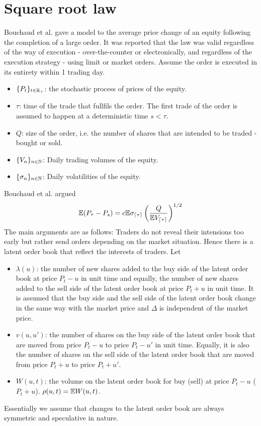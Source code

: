 \section{Square root law}
Bouchaud et al. \cite{Bouchaud2011} gave a model to the average price
change of an equity following the completion of a large order. It was
reported that the law was valid regardless of the way of execution -
over-the-counter or electronically, and regardless of the execution
strategy - using limit or market orders. Assume the order is executed
in its entirety within 1 trading day.
\begin{itemize}
\item $\{P_t\}_{t \in \mathbb R_+}$: the stochastic process of prices of
  the equity.
\item $\tau$: time of the trade that fullfils the order. The first
  trade of the order is assumed to happen at a deterministic time
  $s < \tau$.
\item $Q$: size of the order, i.e. the number of shares that are
  intended to be traded - bought or sold.
\item $\{V_n\}_{n \in \mathbb N}$: Daily trading volumes of the
  equity.
\item $\{\sigma_n\}_{n \in \mathbb N}$: Daily volatilities of the
  equity.
\end{itemize}
Bouchaud et al. argued
\[
  \mathbb{E} (P_\tau - P_s) = c \mathbb{E} \sigma_{\lceil \tau\rceil} \left(
    {Q \over \mathbb{E} V_{\lceil \tau\rceil}}
  \right)^{1/2}
\]
The main arguments are as follows: Traders do not reveal their
intensions too early but rather send orders depending on the market
situation. Hence there is a latent order book that reflect the
interests of traders. Let
\begin{itemize}
\item $\lambda(u)$: the number of new shares added to the buy side of
  the latent order book at price $P_t - u$ in unit time and equally,
  the number of new shares added to the sell side of the latent order
  book at price $P_t + u$ in unit time. It is assumed that the buy
  side and the sell side of the latent order book change in the same
  way with the market price and $\Delta$ is independent of the market
  price.

\item $v(u, u')$: the number of shares on the buy side of the latent
  order book that are moved from price $P_t - u$ to price $P_t - u'$
  in unit time. Equally, it is also the number of shares on the sell
  side of the latent order book that are moved from price $P_t + u$
  to price $P_t + u'$.

\item $W (u, t)$: the volume on the latent order book for buy (sell)
  at price $P_t - u$ ($P_t + u$). $\rho(u, t) = \mathbb{E} W(u, t)$.
\end{itemize}

Essentially we assume that changes to the latent order book are always
symmetric and speculative in nature.



